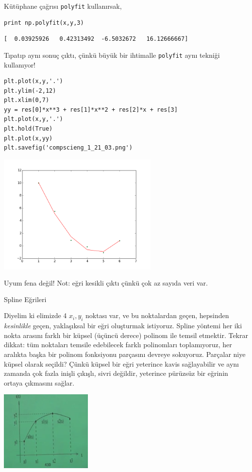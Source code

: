 \documentclass[12pt,fleqn]{article}\usepackage{../../common}
\begin{document}
Kütüphane çağrısı \verb!polyfit! kullanırsak,

\begin{verbatim}
print np.polyfit(x,y,3)
\end{verbatim}

\begin{verbatim}
[  0.03925926   0.42313492  -6.5032672   16.12666667]
\end{verbatim}

Tıpatıp aynı sonuç çıktı, çünkü büyük bir ihtimalle \verb!polyfit! aynı
tekniği kullanıyor! 

\begin{verbatim}
plt.plot(x,y,'.')
plt.ylim(-2,12)
plt.xlim(0,7)
yy = res[0]*x**3 + res[1]*x**2 + res[2]*x + res[3]
plt.plot(x,y,'.')
plt.hold(True)
plt.plot(x,yy)
plt.savefig('compscieng_1_21_03.png')
\end{verbatim}

\includegraphics[height=6cm]{compscieng_1_21_03.png}

Uyum fena değil! Not: eğri kesikli çıktı çünkü çok az sayıda veri var. 

Spline Eğrileri

Diyelim ki elimizde 4 $x_i,y_i$ noktası var, ve bu noktalardan geçen,
hepsinden {\em kesinlikle} geçen, yaklaşıksal bir eğri oluşturmak
istiyoruz. Spline yöntemi her iki nokta arasını farklı bir küpsel (üçüncü
derece) polinom ile temsil etmektir. Tekrar dikkat: tüm noktaları temsile
edebilecek farklı polinomları toplamıyoruz, her aralıkta başka bir polinom
fonksiyonu parçasını devreye sokuyoruz. Parçalar niye küpsel olarak
seçildi? Çünkü küpsel bir eğri yeterince kavis sağlayabilir ve aynı zamanda
çok fazla inişli çıkışlı, sivri değildir, yeterince pürüzsüz bir eğrinin
ortaya çıkmasını sağlar.

\includegraphics[height=4cm]{spline1.png}
\end{document}
